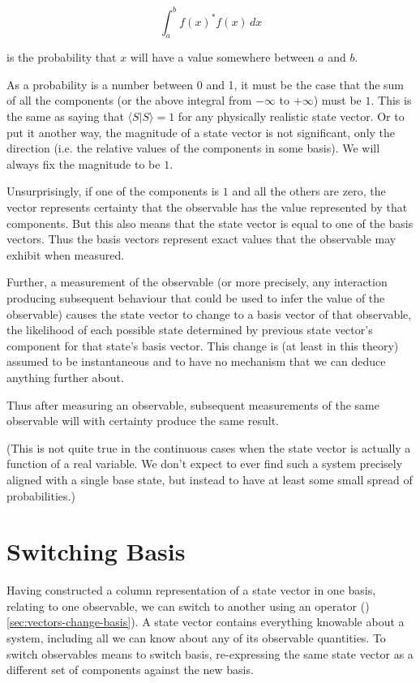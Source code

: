 $$\int_{a}^{b} f(x)^* f(x) \, dx$$

is the probability that $x$ will have a value somewhere between $a$ and $b$.

As a probability is a number between 0 and 1, it must be the case that the sum of all the components (or the above integral from $-\infty$ to $+\infty$) must be $1$. This is the same as saying that $\langle S | S \rangle = 1$ for any physically realistic state vector. Or to put it another way, the magnitude of a state vector is not significant, only the direction (i.e. the relative values of the components in some basis). We will always fix the magnitude to be $1$.

Unsurprisingly, if one of the components is $1$ and all the others are zero, the vector represents certainty that the observable has the value represented by that components. But this also means that the state vector is equal to one of the basis vectors. Thus the basis vectors represent exact values that the observable may exhibit when measured.

Further, a measurement of the observable (or more precisely, any interaction producing subsequent behaviour that could be used to infer the value of the observable) causes the state vector to change to a basis vector of that observable, the likelihood of each possible state determined by previous state vector's component for that state's basis vector. This change is (at least in this theory) assumed to be instantaneous and to have no mechanism that we can deduce anything further about.

Thus after measuring an observable, subsequent measurements of the same observable will with certainty produce the same result.

(This is not quite true in the continuous cases when the state vector is actually a function of a real variable. We don't expect to ever find such a system precisely aligned with a single base state, but instead to have at least some small spread of probabilities.)

\section{Switching Basis}

Having constructed a column representation of a state vector in one basis, relating to one observable, we can switch to another using an operator ()\ref{sec:vectors-change-basis}). A state vector contains everything knowable about a system, including all we can know about any of its observable quantities. To switch observables means to switch basis, re-expressing the same state vector as a different set of components against the new basis.

